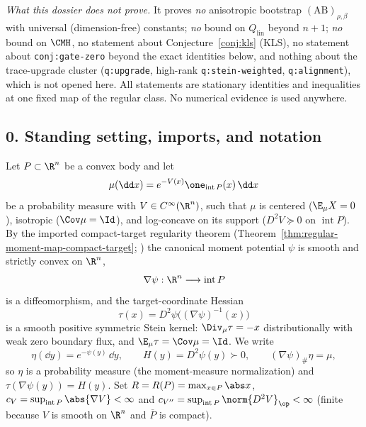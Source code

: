 \documentclass[../main.tex]{subfiles}
\begin{document}
\emph{What this dossier does not prove.}  It proves \emph{no} anisotropic bootstrap
$(\mathrm{AB})_{\rho,\beta}$ with universal (dimension-free) constants; \emph{no} bound on
$Q_{\mathrm{lin}}$ beyond $n+1$; \emph{no} bound on $\CMH$, no statement about
Conjecture~\ref{conj:kls} (KLS), no statement about \texttt{conj:gate-zero} beyond the exact
identities below, and nothing about the trace-upgrade cluster (\texttt{q:upgrade}, high-rank
\texttt{q:stein-weighted}, \texttt{q:alignment}), which is not opened here.  All statements are
stationary identities and inequalities at one fixed map of the regular class.  No numerical
evidence is used anywhere.

\subsection*{0. Standing setting, imports, and notation}

\begin{definition}
\label{def:sol-clsr-class}
Let $P\subset\R^n$ be a convex body and let
\[
  \mu(\dd x)=e^{-V(x)}\one_{\operatorname{int}P}(x)\,\dd x
\]
be a probability measure with $V\in C^\infty(\R^n)$, such that $\mu$ is centered
($\E_\mu X=0$), isotropic ($\Cov\mu=\Id$), and log-concave on its support
($D^2V\succeq0$ on $\operatorname{int}P$).  By the imported compact-target regularity theorem
(Theorem~\ref{thm:regular-moment-map-compact-target};
\cite{BermanBerndtsson2013RealMA,Fathi2019SteinMomentMaps}) the canonical moment potential
$\psi$ is smooth and strictly convex on $\R^n$,
\[
  \nabla\psi:\R^n\longrightarrow\operatorname{int}P
\]
is a diffeomorphism, and the target-coordinate Hessian
\[
  \tau(x)=D^2\psi\bigl((\nabla\psi)^{-1}(x)\bigr)
\]
is a smooth positive symmetric Stein kernel: $\Div_\mu\tau=-x$ distributionally with weak zero
boundary flux, and $\E_\mu\tau=\Cov\mu=\Id$.  We write
\[
  \eta(\dd y)=e^{-\psi(y)}\,\dd y,\qquad H(y)=D^2\psi(y)\succ0,\qquad
  (\nabla\psi)_\#\eta=\mu ,
\]
so $\eta$ is a probability measure (the moment-measure normalization) and
$\tau(\nabla\psi(y))=H(y)$.  Set $R=R(P)=\max_{x\in P}\abs x$,
$c_V=\sup_{\operatorname{int}P}\abs{\nabla V}<\infty$ and
$c_{V''}=\sup_{\operatorname{int}P}\norm{D^2V}_\op<\infty$ (finite because $V$ is smooth on
$\R^n$ and $\overline P$ is compact).
\end{definition}
\end{document}
